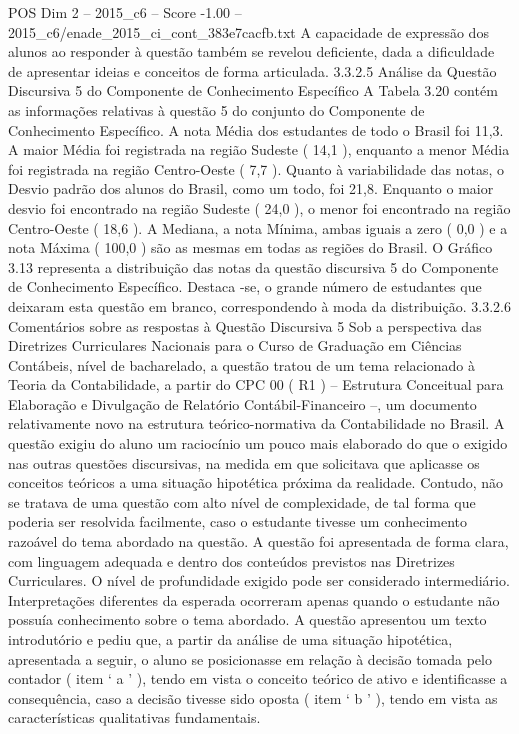 \begin{textsample}{POS Dim 2 – 2015\_c6 – Score -1.00 – 2015\_c6/enade\_2015\_ci\_cont\_383e7cacfb.txt}
A capacidade de expressão dos alunos ao responder à questão também se revelou deficiente, dada a dificuldade de apresentar ideias e conceitos de forma articulada. 3.3.2.5 Análise da Questão Discursiva 5 do Componente de Conhecimento Específico A Tabela 3.20 contém as informações relativas à questão 5 do conjunto do Componente de Conhecimento Específico.
A nota Média dos estudantes de todo o Brasil foi 11,3.
A maior Média foi registrada na região Sudeste ( 14,1 ), enquanto a menor Média foi registrada na região Centro-Oeste ( 7,7 ).
Quanto à variabilidade das notas, o Desvio padrão dos alunos do Brasil, como um todo, foi 21,8.
Enquanto o maior desvio foi encontrado na região Sudeste ( 24,0 ), o menor foi encontrado na região Centro-Oeste ( 18,6 ).
A Mediana, a nota Mínima, ambas iguais a zero ( 0,0 ) e a nota Máxima ( 100,0 ) são as mesmas em todas as regiões do Brasil.
O Gráfico 3.13 representa a distribuição das notas da questão discursiva 5 do Componente de Conhecimento Específico.
Destaca -se, o grande número de estudantes que deixaram esta questão em branco, correspondendo à moda da distribuição. 3.3.2.6 Comentários sobre as respostas à Questão Discursiva 5 Sob a perspectiva das Diretrizes Curriculares Nacionais para o Curso de Graduação em Ciências Contábeis, nível de bacharelado, a questão tratou de um tema relacionado à Teoria da Contabilidade, a partir do CPC 00 ( R1 ) – Estrutura Conceitual para Elaboração e Divulgação de Relatório Contábil-Financeiro –, um documento relativamente novo na estrutura teórico-normativa da Contabilidade no Brasil.
A questão exigiu do aluno um raciocínio um pouco mais elaborado do que o exigido nas outras questões discursivas, na medida em que solicitava que aplicasse os conceitos teóricos a uma situação hipotética próxima da realidade.
Contudo, não se tratava de uma questão com alto nível de complexidade, de tal forma que poderia ser resolvida facilmente, caso o estudante tivesse um conhecimento razoável do tema abordado na questão.
A questão foi apresentada de forma clara, com linguagem adequada e dentro dos conteúdos previstos nas Diretrizes Curriculares.
O nível de profundidade exigido pode ser considerado intermediário.
Interpretações diferentes da esperada ocorreram apenas quando o estudante não possuía conhecimento sobre o tema abordado.
A questão apresentou um texto introdutório e pediu que, a partir da análise de uma situação hipotética, apresentada a seguir, o aluno se posicionasse em relação à decisão tomada pelo contador ( item ‘ a ’ ), tendo em vista o conceito teórico de ativo e identificasse a consequência, caso a decisão tivesse sido oposta ( item ‘ b ’ ), tendo em vista as características qualitativas fundamentais.

\end{textsample}
